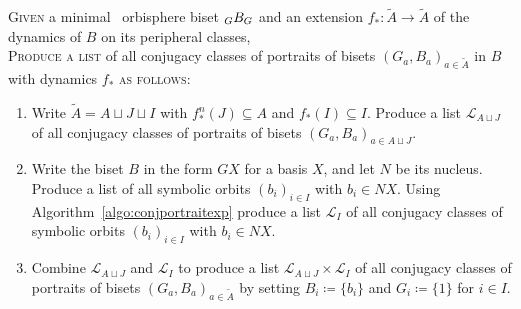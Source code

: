 \documentclass{amsart}
\newcommand\wtA{{\widetilde A}}
\begin{document}
\begin{algo}\label{algo:listportraitexp}
  \textsc{Given} a minimal \Exp\ orbisphere biset $\subscript G B_G$ and an extension $f_*\colon\wtA\to\wtA$ of the dynamics of $B$ on its peripheral classes,\\
  \textsc{Produce a list} of all conjugacy classes of portraits of bisets $(G_a,B_a)_{a\in\wtA}$ in $B$ with dynamics $f_*$ \textsc{as follows:}\\\upshape
  \begin{enumerate}
  \item Write $\wtA=A\sqcup J\sqcup I$ with $f_*^n(J)\subseteq A$
    and $f_*(I)\subseteq I$. Produce a list $\mathcal L_{A\sqcup J}$ of
    all conjugacy classes of portraits of bisets
    $(G_a,B_a)_{a\in A\sqcup J}$.
  \item Write the biset $B$ in the form $G X$ for a basis $X$, and let
    $N$ be its nucleus. Produce a list of all symbolic orbits
    $(b_i)_{i\in I}$ with $b_i\in N X$. Using
    Algorithm~\ref{algo:conjportraitexp} produce a list $\mathcal L_I$
    of all conjugacy classes of symbolic orbits $(b_i)_{i\in I}$ with
    $b_i\in N X$.
  \item Combine $\mathcal L_{A\sqcup J}$ and $\mathcal L_{I}$ to
    produce a list $\mathcal L_{A\sqcup J}\times \mathcal L_{I}$ of
    all conjugacy classes of portraits of bisets
    $(G_a,B_a)_{a\in\wtA}$ by setting $B_i\coloneq \{b_i\}$
    and $G_i\coloneq \{1\}$ for $i\in I$.
  \end{enumerate}
\end{algo}
\end{document}
